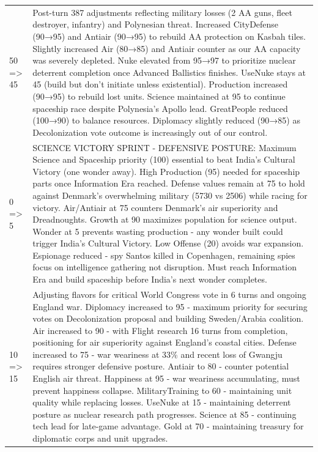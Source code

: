 \begin{longtable}{p{}p{}}
50 => 45 & Post-turn 387 adjustments reflecting military losses (2 AA guns, fleet destroyer, infantry) and Polynesian threat. Increased CityDefense (90→95) and Antiair (90→95) to rebuild AA protection on Kasbah tiles. Slightly increased Air (80→85) and Antiair counter as our AA capacity was severely depleted. Nuke elevated from 95→97 to prioritize nuclear deterrent completion once Advanced Ballistics finishes. UseNuke stays at 45 (build but don't initiate unless existential). Production increased (90→95) to rebuild lost units. Science maintained at 95 to continue spaceship race despite Polynesia's Apollo lead. GreatPeople reduced (100→90) to balance resources. Diplomacy slightly reduced (90→85) as Decolonization vote outcome is increasingly out of our control. \\
0 => 5 & SCIENCE VICTORY SPRINT - DEFENSIVE POSTURE: Maximum Science and Spaceship priority (100) essential to beat India's Cultural Victory (one wonder away). High Production (95) needed for spaceship parts once Information Era reached. Defense values remain at 75 to hold against Denmark's overwhelming military (5730 vs 2506) while racing for victory. Air/Antiair at 75 counters Denmark's air superiority and Dreadnoughts. Growth at 90 maximizes population for science output. Wonder at 5 prevents wasting production - any wonder built could trigger India's Cultural Victory. Low Offense (20) avoids war expansion. Espionage reduced - spy Santos killed in Copenhagen, remaining spies focus on intelligence gathering not disruption. Must reach Information Era and build spaceship before India's next wonder completes. \\
10 => 15 & Adjusting flavors for critical World Congress vote in 6 turns and ongoing England war. Diplomacy increased to 95 - maximum priority for securing votes on Decolonization proposal and building Sweden/Arabia coalition. Air increased to 90 - with Flight research 16 turns from completion, positioning for air superiority against England's coastal cities. Defense increased to 75 - war weariness at 33\% and recent loss of Gwangju requires stronger defensive posture. Antiair to 80 - counter potential English air threat. Happiness at 95 - war weariness accumulating, must prevent happiness collapse. MilitaryTraining to 60 - maintaining unit quality while replacing losses. UseNuke at 15 - maintaining deterrent posture as nuclear research path progresses. Science at 85 - continuing tech lead for late-game advantage. Gold at 70 - maintaining treasury for diplomatic corps and unit upgrades. \\

\end{longtable}
